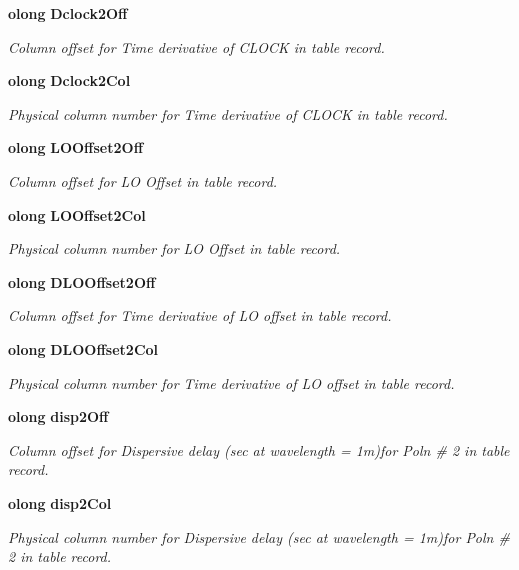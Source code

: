 \begin{CompactItemize}
{\bf olong} {\bf Dclock2Off}
\begin{CompactList}\small\item\em Column offset for Time derivative of CLOCK in table record. \item\end{CompactList}\item 
{\bf olong} {\bf Dclock2Col}
\begin{CompactList}\small\item\em Physical column number for Time derivative of CLOCK in table record. \item\end{CompactList}\item 
{\bf olong} {\bf LOOffset2Off}
\begin{CompactList}\small\item\em Column offset for LO Offset in table record. \item\end{CompactList}\item 
{\bf olong} {\bf LOOffset2Col}
\begin{CompactList}\small\item\em Physical column number for LO Offset in table record. \item\end{CompactList}\item 
{\bf olong} {\bf DLOOffset2Off}
\begin{CompactList}\small\item\em Column offset for Time derivative of LO offset in table record. \item\end{CompactList}\item 
{\bf olong} {\bf DLOOffset2Col}
\begin{CompactList}\small\item\em Physical column number for Time derivative of LO offset in table record. \item\end{CompactList}\item 
{\bf olong} {\bf disp2Off}
\begin{CompactList}\small\item\em Column offset for Dispersive delay (sec at wavelength = 1m)for Poln \# 2 in table record. \item\end{CompactList}\item 
{\bf olong} {\bf disp2Col}
\begin{CompactList}\small\item\em Physical column number for Dispersive delay (sec at wavelength = 1m)for Poln \# 2 in table record. \item\end{CompactList}\item 

\end{CompactItemize}

